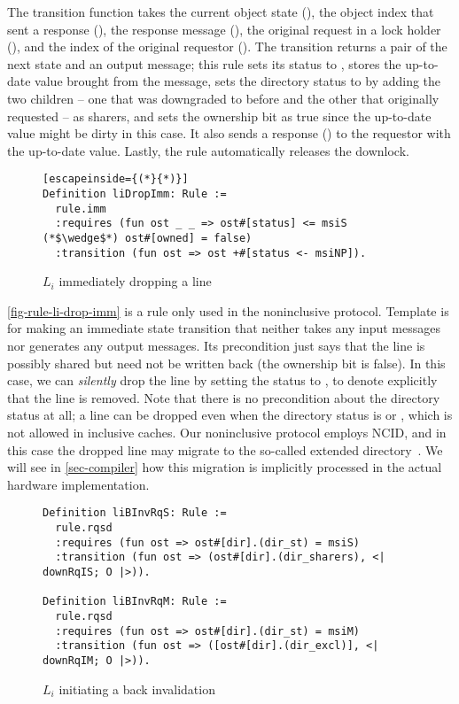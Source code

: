 The transition function takes the current object state (), the object index that sent a response (), the response message (), the original request in a lock holder (), and the index of the original requestor ().
The transition returns a pair of the next state and an output message; this rule sets its status to \stS{}, stores the up-to-date value brought from the  message, sets the directory status to \stS{} by adding the two children -- one that was downgraded to \stS{} before and the other that originally requested \stS{} -- as sharers, and sets the ownership bit as true since the up-to-date value might be dirty in this case.
It also sends a response () to the requestor with the up-to-date value. Lastly, the rule automatically releases the downlock.

\begin{figure}[h]
  \centering
\begin{lstlisting}[escapeinside={(*}{*)}]
Definition liDropImm: Rule :=
  rule.imm
  :requires (fun ost _ _ => ost#[status] <= msiS (*$\wedge$*) ost#[owned] = false)
  :transition (fun ost => ost +#[status <- msiNP]).
\end{lstlisting}
  \caption{$L_i$ immediately dropping a line}
  \label{fig-rule-li-drop-imm}
\end{figure}

\autoref{fig-rule-li-drop-imm} is a rule only used in the noninclusive protocol.
Template  is for making an immediate state transition that neither takes any input messages nor generates any output messages.
Its precondition just says that the line is possibly shared but need not be written back (the ownership bit is false).
In this case, we can \emph{silently} drop the line by setting the status to \stNP{}, to denote explicitly that the line is removed.
Note that there is no precondition about the directory status at all; a line can be dropped even when the directory status is \stS{} or \stM{}, which is not allowed in inclusive caches.
Our noninclusive protocol employs NCID, and in this case the dropped line may migrate to the so-called extended directory~\cite{Zhao:2010}.
We will see in \autoref{sec-compiler} how this migration is implicitly processed in the actual hardware implementation.

\begin{figure}[h]
  \centering
\begin{lstlisting}
Definition liBInvRqS: Rule :=
  rule.rqsd
  :requires (fun ost => ost#[dir].(dir_st) = msiS)
  :transition (fun ost => (ost#[dir].(dir_sharers), <| downRqIS; O |>)).

Definition liBInvRqM: Rule :=
  rule.rqsd
  :requires (fun ost => ost#[dir].(dir_st) = msiM)
  :transition (fun ost => ([ost#[dir].(dir_excl)], <| downRqIM; O |>)).
\end{lstlisting}
  \caption{$L_i$ initiating a back invalidation}
  \label{fig-rule-li-back-inv}
\end{figure}

